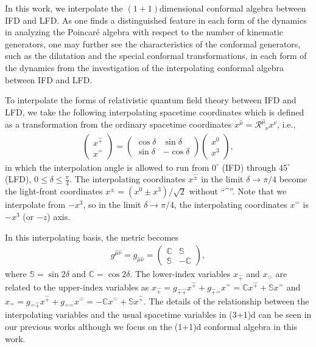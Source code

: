 \documentclass[%
 reprint,
superscriptaddress,
 amsmath,amssymb,
 aps,
]{revtex4-2}
\newcommand{\muT}{\hat{\mu}}
\newcommand{\itP}[1]{\hat{#1}}
\begin{document}
In this work, we interpolate the $(1+1)$dimensional conformal algebra between IFD and LFD. As one finds a distinguished feature in each form of the dynamics in analyzing the Poincaré algebra with respect to the number of kinematic generators, one may further see the characteristics of the conformal generators, such as the dilatation and the special conformal transformations, in each form of the dynamics from the investigation of the interpolating conformal algebra between IFD and LFD.


To interpolate the forms of relativistic quantum field theory between IFD and LFD, we take the following interpolating spacetime coordinates  \cite{Ji2001, Hornbostel1992, Ji1996, Ji2012, Ji2015EM, Ji2015SP, Ji2018QED, Ji2021QCD} which is defined as a transformation from the ordinary spacetime coordinates $x^{\muT}=\mathcal{R}^{\muT}_{\phantom{\mu}{\nu}}x^{\nu}$, i.e.,
\begin{align}\label{eqn:interpolation_angle_definition}
  \begin{pmatrix}
    x^{\hat{+}}\\
    x^{\hat{-}}
  \end{pmatrix}=
  \begin{pmatrix}
    \cos\delta  & \sin\delta \\
    \sin\delta  & -\cos\delta
  \end{pmatrix}
  \begin{pmatrix}
    x^{0}\\
    x^{3}
  \end{pmatrix},
\end{align}
in which the interpolation angle is allowed to run from $0^\circ$ (IFD) through $45^\circ$ (LFD), $0\le \delta \le \frac{\pi}{4}$. The interpolating coordinates $x^{\itP{\pm}}$ in the limit $\delta\rightarrow\pi/4$ become the light-front coordinates $x^{\pm}=(x^{0}\pm x^{3})/\sqrt{2}$ without  ``\textasciicircum''. Note that we interpolate from $-x^3$, so in the limit $\delta\rightarrow\pi/4$, the interpolating coordinates $x^{\itP{-}}$ is $-x^3$ (or $-z$) axis. 

 In this interpolating basis, the metric becomes
\begin{align}\label{eqn:g_munu_interpolation}
  g^{\hat{\mu}\hat{\nu}}
  = g_{\hat{\mu}\hat{\nu}}
  =
  \begin{pmatrix}
    \mathbb{C}  & \mathbb{S} \\
    \mathbb{S}  & -\mathbb{C}
  \end{pmatrix},
\end{align}
where $\mathbb{S}=\sin2\delta$ and $\mathbb{C}=\cos2\delta$. The lower-index variables $x_{\hat{+}}$ and $x_{\hat{-}}$ are related to the upper-index variables as $x_{\hat{+}}=g_{\hat{+}\hat{+}}x^{\hat{+}}+g_{\hat{+}\hat{-}}x^{\hat{-}}=\mathbb{C}x^{\hat{+}}+\mathbb{S}x^{\hat{-}}$ and $x_{\hat{-}}=g_{\hat{-}\hat{+}}x^{\hat{+}}+g_{\hat{-}\hat{-}}x^{\hat{-}}=-\mathbb{C}x^{\hat{-}}+\mathbb{S}x^{\hat{+}}$.
The details of the relationship between the
interpolating variables and the usual spacetime variables
in (3+1)d can be seen in our previous works  \cite{Ji2001, Hornbostel1992, Ji1996, Ji2012, Ji2015EM, Ji2015SP, Ji2018QED, Ji2021QCD} although we focus on the (1+1)d conformal algebra in this work.
\end{document}
